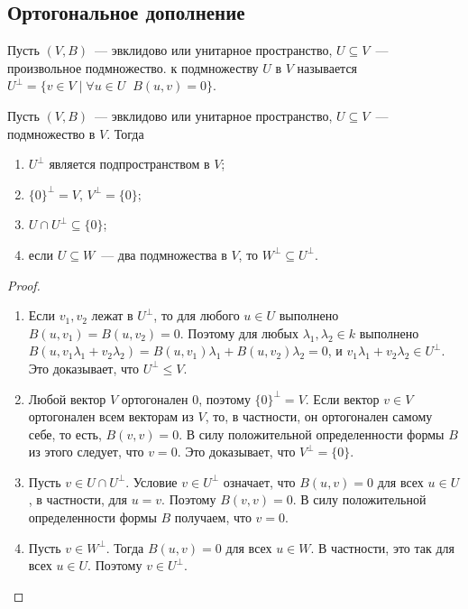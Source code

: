 \subsection{Ортогональное дополнение}


\begin{definition}
Пусть $(V,B)$~--- эвклидово или унитарное пространство, $U\subseteq V$~---
произвольное подмножество.
 к подмножеству
$U$ в $V$ называется
$U^\perp = \{v\in V\mid \forall u\in U\;\; B(u,v) = 0\}$.
\end{definition}

\begin{proposition}\label{prop:orthogonal-complement-properties}
Пусть $(V,B)$~--- эвклидово или унитарное пространство,
$U\subseteq V$~--- подмножество в $V$. Тогда
\begin{enumerate}
\item $U^\perp$ является подпространством в $V$;
\item $\{0\}^\perp = V$, $V^\perp = \{0\}$;
\item $U\cap U^\perp \subseteq\{0\}$;
\item если $U\subseteq W$~--- два подмножества в $V$, то $W^\perp\subseteq U^\perp$.
\end{enumerate}
\end{proposition}
\begin{proof}
\begin{enumerate}
\item Если $v_1,v_2$ лежат в $U^\perp$, то для любого $u\in U$ выполнено
  $B(u,v_1) = B(u,v_2) = 0$. Поэтому для любых $\lambda_1,\lambda_2\in
  k$ выполнено $B(u,v_1\lambda_1+v_2\lambda_2) = B(u,v_1)\lambda_1 +
  B(u,v_2)\lambda_2 = 0$, и $v_1\lambda_1+v_2\lambda_2\in
  U^\perp$. Это доказывает, что $U^\perp\leq V$.
\item Любой вектор $V$ ортогонален $0$, поэтому $\{0\}^\perp = V$. Если
  вектор $v\in V$ ортогонален всем векторам из $V$, то, в частности,
  он ортогонален самому себе, то есть, $B(v,v)=0$. В силу
  положительной определенности формы $B$ из этого следует, что
  $v=0$. Это доказывает, что $V^\perp = \{0\}$.
\item Пусть $v\in U\cap U^\perp$. Условие $v\in U^\perp$ означает,
  что $B(u,v) = 0$ для всех $u\in U$, в частности, для $u=v$.
  Поэтому $B(v,v)=0$. В силу положительной определенности формы $B$
  получаем, что $v=0$.
\item Пусть $v\in W^\perp$. Тогда $B(u,v) = 0$ для всех $u\in W$. В частности,
  это так для всех $u\in U$. Поэтому $v\in U^\perp$.
\end{enumerate}
\end{proof}

